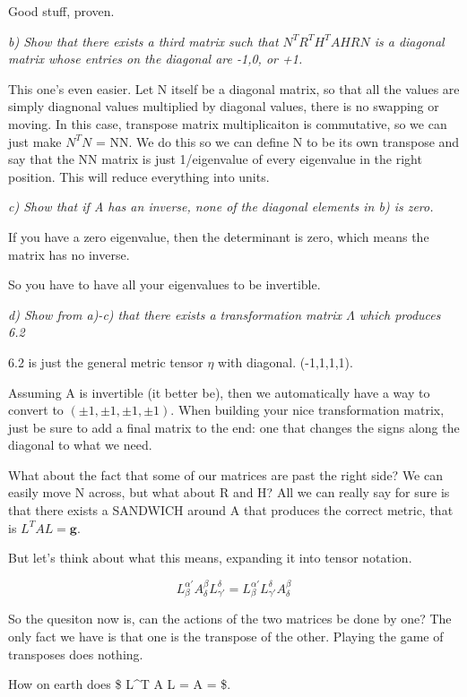 \documentclass[landscape,letterpaper,10pt,english]{article}
\begin{document}
Good stuff, proven.

    \emph{b) Show that there exists a third matrix such that
\(N^TR^TH^TAHRN\) is a diagonal matrix whose entries on the diagonal are
-1,0, or +1.}

    This one's even easier. Let N itself be a diagonal matrix, so that all
the values are simply diagnonal values multiplied by diagonal values,
there is no swapping or moving. In this case, transpose matrix
multiplicaiton is commutative, so we can just make \(N^TN\) = NN. We do
this so we can define N to be its own transpose and say that the NN
matrix is just 1/\textbar eigenvalue\textbar{} of every eigenvalue in
the right position. This will reduce everything into units.

    \emph{c) Show that if A has an inverse, none of the diagonal elements in
b) is zero.}

If you have a zero eigenvalue, then the determinant is zero, which means
the matrix has no inverse.

So you have to have all your eigenvalues to be invertible.

    \emph{d) Show from a)-c) that there exists a transformation matrix
\(\Lambda\) which produces 6.2}

6.2 is just the general metric tensor \(\eta\) with diagonal.
(-1,1,1,1).

Assuming A is invertible (it better be), then we automatically have a
way to convert to \((\pm1,\pm1,\pm1,\pm1)\). When building your nice
transformation matrix, just be sure to add a final matrix to the end:
one that changes the signs along the diagonal to what we need.

What about the fact that some of our matrices are past the right side?
We can easily move N across, but what about R and H? All we can really
say for sure is that there exists a SANDWICH around A that produces the
correct metric, that is \(L^TAL = \textbf{g}\).

But let's think about what this means, expanding it into tensor
notation.

\[ L^{\alpha'}_{\beta} A^\beta_{\delta} L^{\delta}_{\gamma'} = L^{\alpha'}_{\beta} L^{\delta}_{\gamma'}  A^\beta_{\delta} \]

    So the quesiton now is, can the actions of the two matrices be done by
one? The only fact we have is that one is the transpose of the other.
Playing the game of transposes does nothing.

How on earth does \$ L\^{}T A L = \eta \rightarrow \Lambda A = \eta \$.
\end{document}
